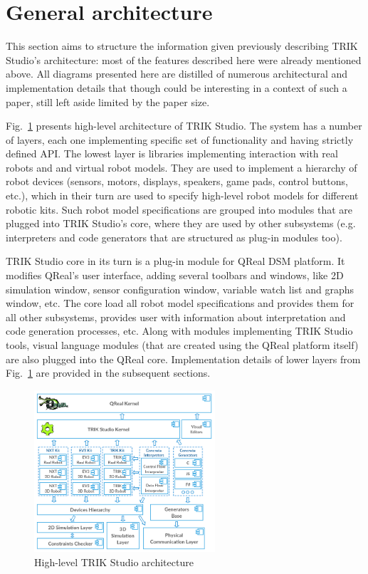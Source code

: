 \documentclass[conference]{IEEEtran}
\begin{document}
\section{General architecture}
\label{chapter:commonArchitecture}

This section aims to structure the information given previously describing TRIK Studio's architecture: most of the features described here were already mentioned above. All diagrams presented here are distilled of numerous architectural and implementation details that though could be interesting in a context of such a paper, still left aside limited by the paper size.

Fig.~\ref{image:commonTSArch} presents high-level architecture of TRIK Studio. The system has a number of layers, each one implementing specific set of functionality and having strictly defined API. The lowest layer is libraries implementing interaction with real robots and and virtual robot models. They are used to implement a hierarchy of robot devices (sensors, motors, displays, speakers, game pads, control buttons, etc.), which in their turn are used to specify high-level robot models for different robotic kits. Such robot model specifications are grouped into modules that are plugged into TRIK Studio's core, where they are used by other subsystems (e.g. interpreters and code generators that are structured as plug-in modules too).

TRIK Studio core in its turn is a plug-in module for QReal DSM platform. It modifies QReal's user interface, adding several toolbars and windows, like 2D simulation window, sensor configuration window, variable watch list and graphs window, etc. The core load all robot model specifications and provides them for all other subsystems, provides user with information about interpretation and code generation processes, etc. Along with modules implementing TRIK Studio tools, visual language modules (that are created using the QReal platform itself) are also plugged into the QReal core. Implementation details of lower layers from Fig.~\ref{image:commonTSArch} are provided in the subsequent sections.

\begin{figure}[ht]
    \centering
    \includegraphics[width=0.6\textwidth]{TS_Common_Architecture.png}
    \caption{High-level TRIK Studio architecture}
    \label{image:commonTSArch}
\end{figure}
\end{document}
